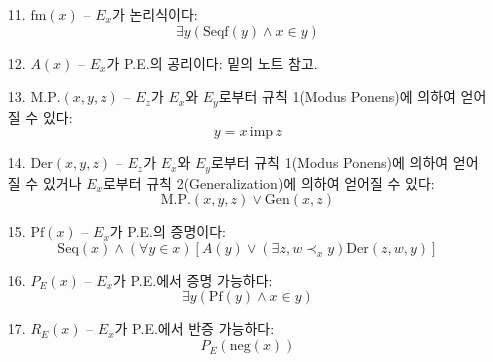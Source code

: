 \documentclass[12pt]{paper}
\begin{document}
\begin{enumerate}
\item[{11.}] $\mathrm{fm} \left( x \right)$ -- $E_x$가 논리식이다:
$$ \exists y \left( \mathrm{Seqf} \left( y \right) \land x \in y \right) $$
\item[{12.}] $A \left( x \right)$ -- $E_x$가 P.E.의 공리이다: 밑의 노트 참고.
\item[{13.}] $\mathrm{M.P.} \left( x , y , z \right)$ -- $E_z$가 $E_x$와 $E_y$로부터 규칙 1(Modus Ponens)에 의하여 얻어질 수 있다:
$$ y = x \, \mathrm{imp} \, z $$
\item[{14.}] $\mathrm{Der} \left( x , y , z \right)$ -- $E_z$가 $E_x$와 $E_y$로부터 규칙 1(Modus Ponens)에 의하여 얻어질 수 있거나 $E_x$로부터 규칙 2(Generalization)에 의하여 얻어질 수 있다:
$$\mathrm{M.P.} \left( x , y , z \right) \lor \mathrm{Gen} \left( x , z \right)$$
\item[{15.}] $\mathrm{Pf} \left( x \right)$ -- $E_x$가 P.E.의 증명이다:
$$ \mathrm{Seq} \left( x \right) \land \left( \forall y \in x \right) \left[ A \left( y \right) \lor \left( \exists z , w \prec_x y \right) \mathrm{Der} \left( z , w , y \right) \right] $$
\item[{16.}] $P_E \left( x \right)$ -- $E_x$가 P.E.에서 증명 가능하다:
$$ \exists y \left( \mathrm{Pf} \left( y \right) \land x \in y \right) $$
\item[{17.}] $R_E \left( x \right)$ -- $E_x$가 P.E.에서 반증 가능하다:
$$ P_E \left( \mathrm {neg} \left( x \right) \right) $$
\end{enumerate}
\end{document}
